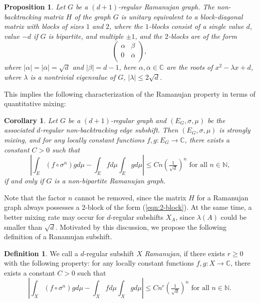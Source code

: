 \documentclass[12pt]{article}
\newtheorem{proposition}[theorem]{Proposition}
\newtheorem{corollary}{Corollary}[theorem]
\theoremstyle{definition}
\newtheorem{definition}{Definition}
\begin{document}
\begin{proposition}\label{prop:BassHashimoto}
Let $G$ be a $(d+1)$-regular Ramanujan graph. The non-backtracking matrix $H$ of the graph $G$
is unitary equivalent to a block-diagonal matrix with blocks of sizes $1$ and $2$, where the $1$-blocks consist of a single value $d$, value $-d$ if $G$ is bipartite, and multiple $\pm 1$, and the $2$-blocks are of the form
\begin{equation}\label{eqn:2-block}
\left(
  \begin{array}{cc}
    \alpha & \beta \\
    0 & \overline{\alpha} \\
  \end{array}
\right),
\end{equation}
where $|\alpha|=|\overline{\alpha}|=\sqrt{d}$ and $|\beta|=d-1$, here $\alpha,\overline{\alpha}\in\mathbb{C}$ are the roots of $x^2-\lambda x+d$, where $\lambda$ is a nontrivial eigenvalue of $G$, $|\lambda|\leq 2\sqrt{d}$.
\end{proposition}

This implies the following characterization of the Ramanujan property in terms of quantitative mixing:

\begin{corollary}
Let $G$ be a $(d+1)$-regular graph and $(E_G,\sigma,\mu)$ be the associated $d$-regular non-backtracking edge subshift. Then $(E_G,\sigma,\mu)$ is strongly mixing, and for any locally constant functions $f,g:E_G\rightarrow\mathbb{C}$, there exists a constant $C>0$ such that
\[
\left|\int_E (f\circ\sigma^n)gd\mu - \int_Efd\mu\int_Egd\mu\right|\leq Cn\left(\tfrac{1}{\sqrt{d}}\right)^n \mbox{ for all $n\in\mathbb{N}$,}
\]
if and only if $G$ is a non-bipartite Ramanujan graph.
\end{corollary}

Note that the factor $n$ cannot be removed, since the matrix $H$ for a Ramanujan graph always possesses a $2$-block of the form (\ref{eqn:2-block}). At the same time, a better mixing rate may occur for $d$-regular subshifts $X_A$, since $\lambda(A)$ could be smaller than $\sqrt{d}$. Motivated by this discussion, we propose the following definition of a Ranamujan subshift.


\begin{definition}
We call a $d$-regular subshift $X$ \textit{Ramanujan}, if there exists $r\geq 0$ with the following property: for any locally constant functions $f,g:X\rightarrow\mathbb{C}$, there exists a constant $C>0$ such that
\[
\left|\int_X (f\circ\sigma^n)gd\mu - \int_Xfd\mu\int_Xgd\mu\right|\leq Cn^r\left(\tfrac{1}{\sqrt{d}}\right)^n \mbox{ for all $n\in\mathbb{N}$.}
\]
\end{definition}
\end{document}
